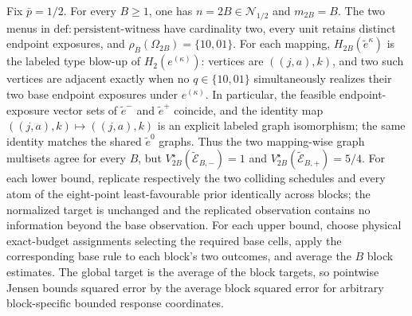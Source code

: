 Fix \(\bar p=1/2\). For every \(B\ge1\), one has \(n=2B\in\mathcal N_{1/2}\) and \(m_{2B}=B\). The two menus in \(\mathrm{def{:}persistent\text{-}witness}\) have cardinality two, every unit retains distinct endpoint exposures, and \(\rho_B(\Omega_{2B})=\{10,01\}\). For each mapping, \(H_{2B}(\widetilde e^\kappa)\) is the labeled type blow-up of \(H_2(e^{(\kappa)})\): vertices are \(((j,a),k)\), and two such vertices are adjacent exactly when no \(q\in\{10,01\}\) simultaneously realizes their two base endpoint exposures under \(e^{(\kappa)}\). In particular, the feasible endpoint-exposure vector sets of \(\widetilde e^-\) and \(\widetilde e^+\) coincide, and the identity map \(((j,a),k)\mapsto((j,a),k)\) is an explicit labeled graph isomorphism; the same identity matches the shared \(\widetilde e^0\) graphs. Thus the two mapping-wise graph multisets agree for every \(B\), but \(V_{2B}^\star(\widetilde{\mathcal E}_{B,-})=1\) and \(V_{2B}^\star(\widetilde{\mathcal E}_{B,+})=5/4\). For each lower bound, replicate respectively the two colliding schedules and every atom of the eight-point least-favourable prior identically across blocks; the normalized target is unchanged and the replicated observation contains no information beyond the base observation. For each upper bound, choose physical exact-budget assignments selecting the required base cells, apply the corresponding base rule to each block's two outcomes, and average the \(B\) block estimates. The global target is the average of the block targets, so pointwise Jensen bounds squared error by the average block squared error for arbitrary block-specific bounded response coordinates.